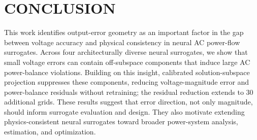 \documentclass{article}
\begin{document}
\section{CONCLUSION}

This work identifies output-error geometry as an important factor in the gap
between voltage accuracy and physical consistency in neural AC
power-flow surrogates. Across four architecturally diverse neural surrogates, we show that small voltage errors can contain off-subspace
components that induce large AC power-balance violations. Building on
this insight, calibrated solution-subspace projection suppresses these
components, reducing voltage-magnitude error and power-balance residuals
without retraining; the residual reduction extends to 30 additional
grids. These results suggest that error direction, not only magnitude,
should inform surrogate evaluation and design. They also motivate
extending physics-consistent neural surrogates toward broader
power-system analysis, estimation, and optimization.





\end{document}
